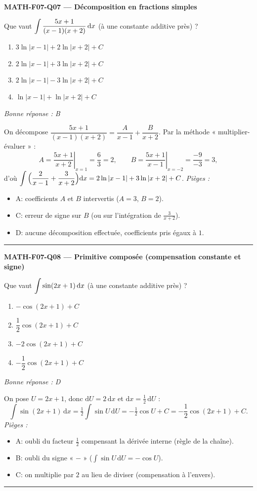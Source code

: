 \documentclass[11pt,a4paper]{article}
\begin{document}
\noindent\textbf{MATH-F07-Q07 --- Décomposition en fractions simples}\par
Que vaut $\displaystyle\int \dfrac{5x+1}{(x-1)(x+2)}\,\mathrm{d}x$ (à une constante additive près) ?
\begin{enumerate}[label=\Alph*)]
\item $3\ln|x-1|+2\ln|x+2|+C$
\item $2\ln|x-1|+3\ln|x+2|+C$
\item $2\ln|x-1|-3\ln|x+2|+C$
\item $\ln|x-1|+\ln|x+2|+C$
\end{enumerate}
\textit{Bonne réponse : B}\par
On décompose $\dfrac{5x+1}{(x-1)(x+2)}=\dfrac{A}{x-1}+\dfrac{B}{x+2}$. Par la méthode « multiplier-évaluer » :
\[
A=\left.\dfrac{5x+1}{x+2}\right|_{x=1}=\dfrac{6}{3}=2,\qquad
B=\left.\dfrac{5x+1}{x-1}\right|_{x=-2}=\dfrac{-9}{-3}=3,
\]
d'où $\displaystyle\int\Big(\dfrac{2}{x-1}+\dfrac{3}{x+2}\Big)\mathrm{d}x=2\ln|x-1|+3\ln|x+2|+C$.
\textit{Pièges :}
\begin{itemize}
\item A: coefficients $A$ et $B$ intervertis ($A=3$, $B=2$).
\item C: erreur de signe sur $B$ (ou sur l'intégration de $\tfrac{3}{x+2}$).
\item D: aucune décomposition effectuée, coefficients pris égaux à $1$.
\end{itemize}
\vspace{8pt}\hrule\vspace{8pt}

\noindent\textbf{MATH-F07-Q08 --- Primitive composée (compensation constante et signe)}\par
Que vaut $\displaystyle\int \sin(2x+1)\,\mathrm{d}x$ (à une constante additive près) ?
\begin{enumerate}[label=\Alph*)]
\item $-\cos(2x+1)+C$
\item $\dfrac{1}{2}\cos(2x+1)+C$
\item $-2\cos(2x+1)+C$
\item $-\dfrac{1}{2}\cos(2x+1)+C$
\end{enumerate}
\textit{Bonne réponse : D}\par
On pose $U=2x+1$, donc $\mathrm{d}U=2\,\mathrm{d}x$ et $\mathrm{d}x=\tfrac12\,\mathrm{d}U$ :
\[
\int \sin(2x+1)\,\mathrm{d}x=\tfrac12\int \sin U\,\mathrm{d}U=-\tfrac12\cos U+C=-\dfrac{1}{2}\cos(2x+1)+C.
\]
\textit{Pièges :}
\begin{itemize}
\item A: oubli du facteur $\tfrac12$ compensant la dérivée interne (règle de la chaîne).
\item B: oubli du signe « $-$ » ($\int\sin U\,\mathrm{d}U=-\cos U$).
\item C: on multiplie par $2$ au lieu de diviser (compensation à l'envers).
\end{itemize}
\vspace{8pt}\hrule\vspace{8pt}
\end{document}
